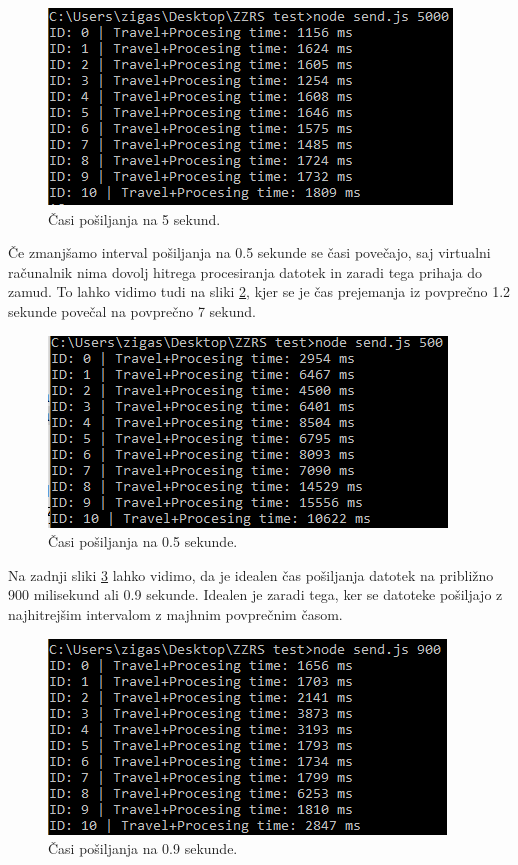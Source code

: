 \begin{figure}[H]
    \centering
    \includegraphics[scale=0.8]{Img/3_breme1.png}
    \caption{Časi pošiljanja na 5 sekund.}
    \label{fig:3_7_breme1}
\end{figure}

Če zmanjšamo interval pošiljanja na 0.5 sekunde se časi povečajo, saj virtualni računalnik nima dovolj hitrega procesiranja datotek in zaradi tega prihaja do zamud. To lahko vidimo tudi na sliki \ref{fig:3_7_breme2}, kjer se je čas prejemanja iz povprečno 1.2 sekunde povečal na povprečno 7 sekund.

\begin{figure}[H]
    \centering
    \includegraphics[scale=0.8]{Img/3_breme2.png}
    \caption{Časi pošiljanja na 0.5 sekunde.}
    \label{fig:3_7_breme2}
\end{figure}

Na zadnji sliki \ref{fig:3_7_breme3} lahko vidimo, da je idealen čas pošiljanja datotek na približno 900 milisekund ali 0.9 sekunde. Idealen je zaradi tega, ker se datoteke pošiljajo z najhitrejšim intervalom z majhnim povprečnim časom.

\begin{figure}[H]
    \centering
    \includegraphics[scale=0.8]{Img/3_breme3.png}
    \caption{Časi pošiljanja na 0.9 sekunde.}
    \label{fig:3_7_breme3}
\end{figure}

